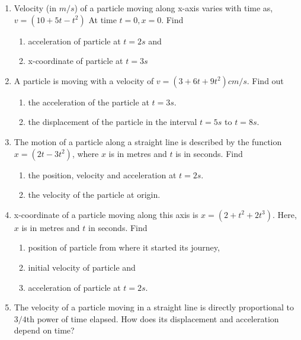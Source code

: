 \documentclass{article}
\begin{document}
\begin{enumerate}
    \item Velocity (in \(m/s\)) of a particle moving along x-axis varies with time as, \(v = (10 + 5t - t^2)\) At time \(t = 0, x = 0\). Find
    \begin{enumerate}
        \item acceleration of particle at \(t = 2 s\) and
        \item x-coordinate of particle at \(t = 3 s\)
    \end{enumerate}
    \item A particle is moving with a velocity of \(v = (3 + 6t + 9t^2) cm/s\). Find out
    \begin{enumerate}
        \item the acceleration of the particle at \(t = 3 s\).
        \item the displacement of the particle in the interval \(t = 5 s\) to \(t = 8 s\).
    \end{enumerate}
    \item The motion of a particle along a straight line is described by the function \(x = (2t - 3t^2)\), where \(x\) is in metres and \(t\) is in seconds. Find
    \begin{enumerate}
        \item the position, velocity and acceleration at \(t = 2 s\).
        \item the velocity of the particle at origin.
    \end{enumerate}
    \item x-coordinate of a particle moving along this axis is \(x = (2 + t^2 + 2t^3)\). Here, \(x\) is in metres and \(t\) in seconds. Find
    \begin{enumerate}
        \item position of particle from where it started its journey,
        \item initial velocity of particle and
        \item acceleration of particle at \(t = 2 s\).
    \end{enumerate}
    \item The velocity of a particle moving in a straight line is directly proportional to \(3/4\)th power of time elapsed. How does its displacement and acceleration depend on time?
\end{enumerate}

\pagebreak
\end{document}
